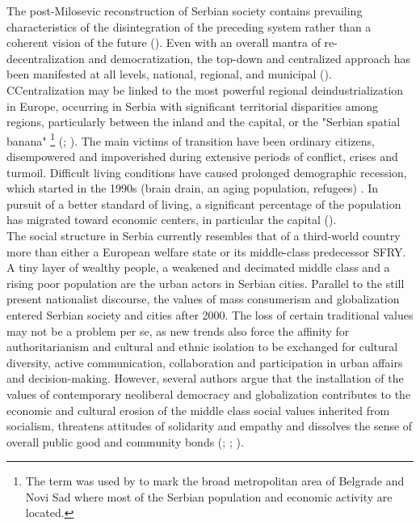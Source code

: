 \documentclass[11pt]{report}
\begin{document}
{{{{The post-Milosevic reconstruction of Serbian society contains prevailing characteristics of the disintegration of the preceding system rather than a coherent vision of the future (\href{Stanilov}{\citealt{stanilov_post-socialist_2007}}). 
Even with an overall mantra of re-decentralization and democratization, the top-down and centralized approach has been manifested at all levels,  national, regional, and municipal (\href{Vukmirovic}{\citealt{vukmirovic_city_2013}}). CCentralization may be linked to the most powerful regional deindustrialization in Europe, occurring in Serbia with significant territorial disparities among regions, particularly between the inland and the capital, or the "Serbian spatial banana"
\footnote{The term was used by \href{Vujosevic}{\cite{vujosevic_collapse_2010}}
to mark the broad metropolitan area of Belgrade and Novi Sad where most of the Serbian population and economic activity are located.}
(\href{Zekovic}{\citealt{zekovic_regionalizacija_2009}}; \href{Vukmirovic}{\citealt{vukmirovic_city_2013}}).
The main victims of transition have been ordinary citizens, disempowered and impoverished during extensive periods of conflict, crises and turmoil.
Difficult living conditions have caused prolonged demographic recession, which started in the 1990s (brain drain, an aging population, refugees) .
In pursuit of a better standard of living, a significant percentage of the population has migrated toward economic centers, in particular the capital (\href{Vukmirovic}{\citealt{vukmirovic_city_2013}}).
\\

The social structure in Serbia currently resembles that of a third-world country more than either a European welfare state or its middle-class predecessor SFRY. A tiny layer of wealthy people, a weakened and decimated middle class and a rising poor population are the urban actors in Serbian cities. Parallel to the still present nationalist discourse, the values of mass consumerism and globalization entered Serbian society and cities after 2000. The loss of certain traditional values may not be a problem per se, as new trends also force the affinity for authoritarianism and cultural and ethnic isolation to be exchanged for cultural diversity, active communication, collaboration and participation in urban affairs and decision-making. However, several authors argue that the installation of the values of contemporary neoliberal democracy and globalization contributes to the economic and cultural erosion of the middle class social values inherited from socialism, threatens attitudes of solidarity and empathy and dissolves the sense of overall public good and community bonds  (\href{Cvejic}{\citealt{cvejic_suzivot_2010}};  \href{Vukmirovic}{\citealt{vukmirovic_city_2013}}; \href{Doytchinov}{\citealt{ doytchinov_belgrade_2015}}).

}}}}
\end{document}
